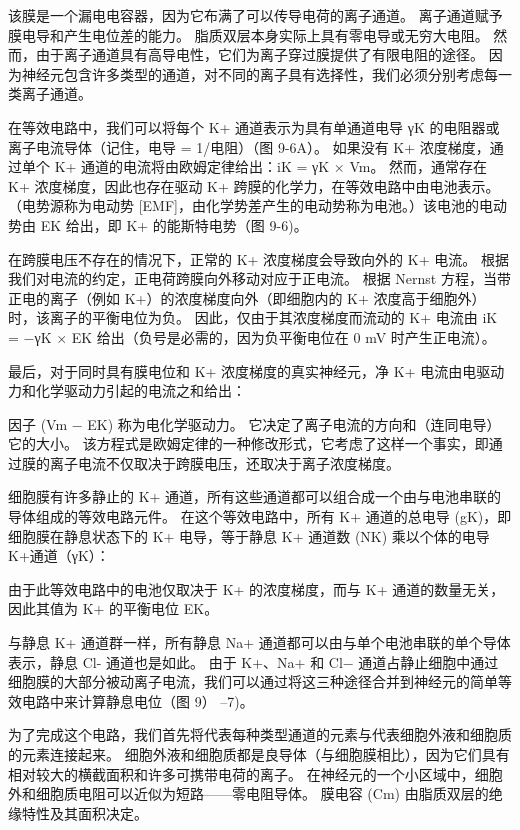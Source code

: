 该膜是一个漏电电容器，因为它布满了可以传导电荷的离子通道。 离子通道赋予膜电导和产生电位差的能力。 脂质双层本身实际上具有零电导或无穷大电阻。 然而，由于离子通道具有高导电性，它们为离子穿过膜提供了有限电阻的途径。 因为神经元包含许多类型的通道，对不同的离子具有选择性，我们必须分别考虑每一类离子通道。

在等效电路中，我们可以将每个 K+ 通道表示为具有单通道电导 γK 的电阻器或离子电流导体（记住，电导 = 1/电阻）（图 9-6A）。 如果没有 K+ 浓度梯度，通过单个 K+ 通道的电流将由欧姆定律给出：iK = γK × Vm。 然而，通常存在 K+ 浓度梯度，因此也存在驱动 K+ 跨膜的化学力，在等效电路中由电池表示。 （电势源称为电动势 [EMF]，由化学势差产生的电动势称为电池。）该电池的电动势由 EK 给出，即 K+ 的能斯特电势（图 9-6)。

在跨膜电压不存在的情况下，正常的 K+ 浓度梯度会导致向外的 K+ 电流。 根据我们对电流的约定，正电荷跨膜向外移动对应于正电流。 根据 Nernst 方程，当带正电的离子（例如 K+）的浓度梯度向外（即细胞内的 K+ 浓度高于细胞外）时，该离子的平衡电位为负。 因此，仅由于其浓度梯度而流动的 K+ 电流由 iK = −γK × EK 给出（负号是必需的，因为负平衡电位在 0 mV 时产生正电流）。

最后，对于同时具有膜电位和 K+ 浓度梯度的真实神经元，净 K+ 电流由电驱动力和化学驱动力引起的电流之和给出：

因子 (Vm − EK) 称为电化学驱动力。 它决定了离子电流的方向和（连同电导）它的大小。 该方程式是欧姆定律的一种修改形式，它考虑了这样一个事实，即通过膜的离子电流不仅取决于跨膜电压，还取决于离子浓度梯度。

细胞膜有许多静止的 K+ 通道，所有这些通道都可以组合成一个由与电池串联的导体组成的等效电路元件。 在这个等效电路中，所有 K+ 通道的总电导 (gK)，即细胞膜在静息状态下的 K+ 电导，等于静息 K+ 通道数 (NK) 乘以个体的电导 K+通道（γK）：

由于此等效电路中的电池仅取决于 K+ 的浓度梯度，而与 K+ 通道的数量无关，因此其值为 K+ 的平衡电位 EK。

与静息 K+ 通道群一样，所有静息 Na+ 通道都可以由与单个电池串联的单个导体表示，静息 Cl- 通道也是如此。 由于 K+、Na+ 和 Cl− 通道占静止细胞中通过细胞膜的大部分被动离子电流，我们可以通过将这三种途径合并到神经元的简单等效电路中来计算静息电位（图 9） –7)。

为了完成这个电路，我们首先将代表每种类型通道的元素与代表细胞外液和细胞质的元素连接起来。 细胞外液和细胞质都是良导体（与细胞膜相比），因为它们具有相对较大的横截面积和许多可携带电荷的离子。 在神经元的一个小区域中，细胞外和细胞质电阻可以近似为短路——零电阻导体。 膜电容 (Cm) 由脂质双层的绝缘特性及其面积决定。

